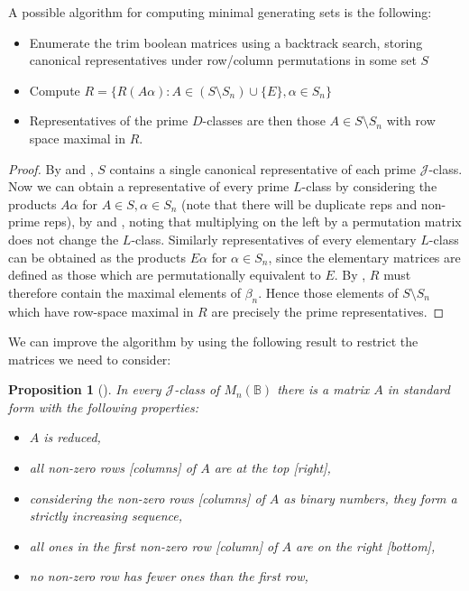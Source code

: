 \documentclass[11pt]{article}
\newtheorem{prop}[thm]{Proposition}
\numberwithin{equation}{section}
\newcommand{\set}[2]{\ensuremath{\{#1 : #2 \}}}
\newcommand{\B}{\mathbb{B}}
\newcommand{\Bn}{M_n(\B)}
\newcommand{\J}{\mathscr{J}}
\begin{document}
A possible algorithm for computing minimal generating sets is the following:

\begin{itemize}
  \item
    Enumerate the trim boolean matrices using a backtrack search, storing 
    canonical representatives under row/column permutations in some set $S$
  \item 
    Compute $R = \set{R(A\alpha)}{A \in (S\setminus S_n) \cup \{E\}, \alpha \in S_n}$
  \item 
    Representatives of the prime $D$-classes are then those $A \in S\setminus S_n$ 
    with row space maximal in $R$.
\end{itemize}

\begin{proof}
  By  and ,
  $S$ contains a single canonical representative of each prime $\J$-class.
  Now we can obtain a representative of every prime $L$-class by considering the
  products $A\alpha$ for $A \in S, \alpha \in S_n$ (note that there will be
  duplicate reps and non-prime reps), by  and
  , noting that multiplying on the left by a
  permutation matrix does not change the $L$-class.
  Similarly representatives of every elementary $L$-class can be obtained as the
  products $E\alpha$ for $\alpha \in S_n$, since the elementary matrices are
  defined as those which are permutationally equivalent to $E$.
  By , $R$ must therefore contain the maximal
  elements of $\beta_n$. Hence those elements of $S \setminus S_n$ which have
  row-space maximal in $R$ are precisely the prime representatives. 
\end{proof}

We can improve the algorithm by using the following result
to restrict the matrices we need to consider:

\begin{prop}[\cite{Breen1997aa}]
  In every $\J$-class of $\Bn$ there is a matrix $A$ in \emph{standard form} with the following properties:
  \begin{itemize}
  \item{$A$ is reduced,}
  \item{all non-zero rows [columns] of $A$ are at the top [right],}
  \item{considering the non-zero rows [columns] of $A$ as binary numbers, they
        form a strictly increasing sequence,}
  \item{all ones in the first non-zero row [column] of $A$ are on the right
        [bottom],}
  \item{no non-zero row has fewer ones than the first row,}
  \end{itemize}
\end{prop}
\end{document}

